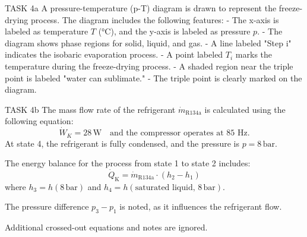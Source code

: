 TASK 4a  
A pressure-temperature (p-T) diagram is drawn to represent the freeze-drying process. The diagram includes the following features:  
- The x-axis is labeled as temperature \( T \) (°C), and the y-axis is labeled as pressure \( p \).  
- The diagram shows phase regions for solid, liquid, and gas.  
- A line labeled "Step i" indicates the isobaric evaporation process.  
- A point labeled \( T_i \) marks the temperature during the freeze-drying process.  
- A shaded region near the triple point is labeled "water can sublimate."  
- The triple point is clearly marked on the diagram.  

TASK 4b  
The mass flow rate of the refrigerant \( \dot{m}_{\text{R134a}} \) is calculated using the following equation:  
\[
\dot{W}_K = 28 \, \text{W} \quad \text{and the compressor operates at 85 Hz.}
\]  
At state 4, the refrigerant is fully condensed, and the pressure is \( p = 8 \, \text{bar} \).  

The energy balance for the process from state 1 to state 2 includes:  
\[
\dot{Q}_{\text{K}} = \dot{m}_{\text{R134a}} \cdot (h_2 - h_1)
\]  
where \( h_3 = h(8 \, \text{bar}) \) and \( h_4 = h(\text{saturated liquid, } 8 \, \text{bar}) \).  

The pressure difference \( p_3 - p_1 \) is noted, as it influences the refrigerant flow.  

Additional crossed-out equations and notes are ignored.